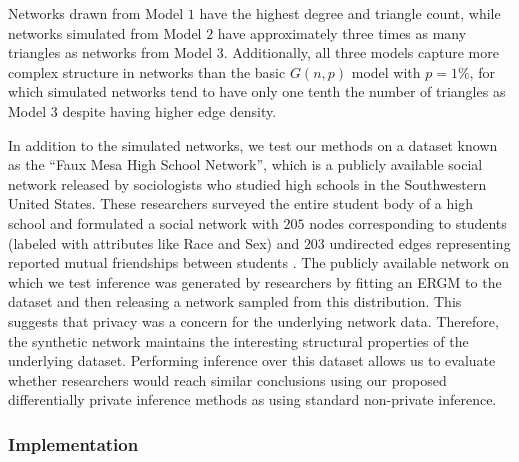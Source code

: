  	 Networks drawn from Model $1$ have the highest degree and triangle count, while networks simulated from Model $2$ have approximately three times as many triangles as networks from Model $3$. Additionally, all three models capture more complex structure in networks than the basic $G(n,p)$ model with $p = 1\%$, for which simulated networks tend to have only one tenth the number of triangles as Model $3$ despite having higher edge density.  
 	
 	 In addition to the simulated networks, we test our methods on a dataset known as the ``Faux Mesa High School Network'', which is a publicly available social network released by sociologists who studied high schools in the Southwestern United States. These researchers surveyed the entire student body of a high school and formulated a social network with $205$ nodes corresponding to students (labeled with attributes like Race and Sex) and $203$ undirected edges representing reported mutual friendships between students \cite{ergm}. The publicly available network on which we test inference was generated by researchers by fitting an ERGM to the dataset and then releasing a network sampled from this distribution. This suggests that privacy was a concern for the underlying network data. Therefore, the synthetic network maintains the interesting structural properties of the underlying dataset. Performing inference over this dataset allows us to evaluate whether researchers would reach similar conclusions using our proposed differentially private inference methods as using standard non-private inference. 
  
\subsubsection*{Implementation}


